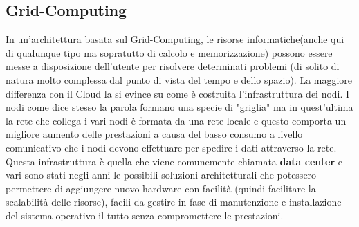 \subsection{Grid-Computing}
In un'architettura basata sul Grid-Computing, le risorse informatiche(anche qui di qualunque tipo ma sopratutto di calcolo e memorizzazione) possono essere messe a disposizione dell'utente per risolvere determinati problemi (di solito di natura molto complessa dal punto di vista del tempo e dello spazio). La maggiore differenza con il Cloud la si evince su come è costruita l'infrastruttura dei nodi. I nodi come dice stesso la parola formano una specie di "griglia" ma in quest'ultima la rete che collega i vari nodi è formata da una rete locale e questo comporta un migliore aumento delle prestazioni a causa del basso consumo a livello comunicativo che i nodi devono effettuare per spedire i dati attraverso la rete. Questa infrastruttura è quella che viene comunemente chiamata \textbf{data center} e vari sono stati negli anni le possibili soluzioni architetturali che potessero permettere di aggiungere nuovo hardware con facilità (quindi facilitare la scalabilità delle risorse), facili da gestire in fase di manutenzione e installazione del sistema operativo il tutto senza compromettere le prestazioni. 
